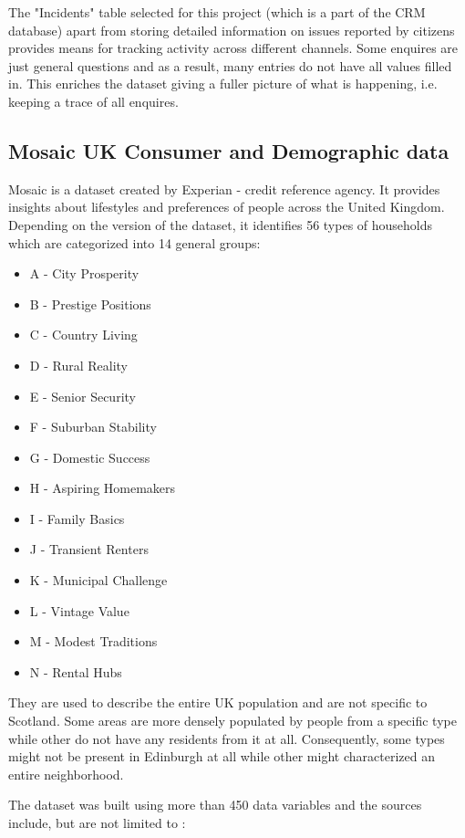 The "Incidents" table selected for this project (which is a part of the CRM database) apart from storing detailed information on issues reported by citizens provides means for tracking activity across different channels. Some enquires are just general questions and as a result, many entries do not have all values filled in. This enriches the dataset giving a fuller picture of what is happening, i.e. keeping a trace of all enquires.		
		
		\subsection{Mosaic UK Consumer and Demographic data}
		
Mosaic is a dataset created by Experian - credit reference agency. It provides insights about lifestyles and preferences of people across the United Kingdom. Depending on the version of the dataset, it identifies 56 types of households which are categorized into 14 general groups:
\begin{itemize}
\item A - City Prosperity
\item B - Prestige Positions
\item C - Country Living
\item D - Rural Reality
\item E - Senior Security
\item F - Suburban Stability
\item G - Domestic Success
\item H - Aspiring Homemakers
\item I - Family Basics
\item J - Transient Renters
\item K - Municipal Challenge
\item L - Vintage Value
\item M - Modest Traditions
\item N - Rental Hubs
\end{itemize}

They are used to describe the entire UK population and are not specific to Scotland. Some areas are more densely populated by people from a specific type while other do not have any residents from it at all. Consequently, some types might not be present in Edinburgh at all while other might characterized an entire neighborhood.

The dataset was built using more than 450 data variables and the sources include, but are not limited to \citep{Experian2014}:	

